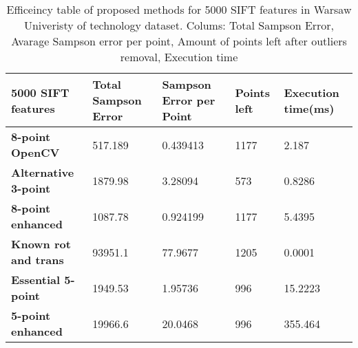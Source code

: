 \begin{table}[h]
\centering
\begin{adjustbox}{width=1\linewidth}
\begin{tabular}{l|l|l|l|l}
\textbf{5000 SIFT features}      & \textbf{Total Sampson Error} & \textbf{Sampson Error per Point} & \textbf{Points left} & \textbf{Execution time(ms)} \\ \hline
\textbf{8-point OpenCV}          & 517.189             & 0.439413                & 1177        & 2.187              \\ \hline
\textbf{Alternative 3-point}     & 1879.98             & 3.28094                 & 573         & 0.8286             \\ \hline
\textbf{8-point enhanced}        & 1087.78             & 0.924199                & 1177        & 5.4395             \\ \hline
\textbf{Known rot and trans}     & 93951.1             & 77.9677                 & 1205        & 0.0001             \\ \hline
\textbf{Essential 5-point}       & 1949.53             & 1.95736                 & 996         & 15.2223            \\ \hline
\textbf{5-point enhanced}        & 19966.6             & 20.0468                 & 996         & 355.464            \\ 
\end{tabular}
\end{adjustbox}
\caption{Efficeincy table of proposed methods for 5000 SIFT features in Warsaw Univeristy of technology dataset. Colums: Total Sampson Error, Avarage Sampson error per point, Amount of points left after outliers removal, Execution time}
\label{table:Efficiency5000Sift}
\end{table}










 




 







